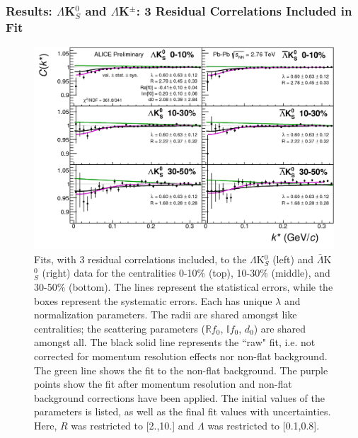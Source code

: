 \documentclass[../AnalysisNoteJBuxton.tex]{subfiles}
\begin{document}
\subsubsection{Results: \texorpdfstring{$\Lambda$K$^{0}_{S}$ and $\Lambda$K$^{\pm}$: 3 Residual Correlations Included in Fit}{TEXT}}
\label{ResultsLamK_3Res}


\begin{figure}[h]
  \centering
  \includegraphics[width=\textwidth]{7_ResultsAndDiscussion/Figures/canKStarCfwFitsLamK0wConj_0010_1030_3050_MomResCrctn_NonFlatBgdCrctn_SingleLamParam_3Res_PrimMaxDecay4fm_UsingXiDataAndCoulombOnly.pdf}
  \caption[$\Lambda$K$^{0}_{S}$($\bar{\Lambda}$K$^{0}_{S}$) Fits with 3 Residuals]{Fits, with 3 residual correlations included, to the $\Lambda$K$^{0}_{S}$ (left) and $\bar{\Lambda}$K$^{0}_{S}$ (right) data for the centralities 0-10\% (top), 10-30\% (middle), and 30-50\% (bottom).
The lines represent the statistical errors, while the boxes represent the systematic errors.
Each has unique $\lambda$ and normalization parameters.
The radii are shared amongst like centralities; the scattering parameters ($\mathbb{R}f_{0}$, $\mathbb{I}f_{0}$, $d_{0}$) are shared amongst all.
The black solid line represents the ``raw" fit, i.e. not corrected for momentum resolution effects nor non-flat background.  
The green line shows the fit to the non-flat background.
The purple points show the fit after momentum resolution and non-flat background corrections have been applied.
The initial values of the parameters is listed, as well as the final fit values with uncertainties.
Here, $R$ was restricted to [2.,10.] and $\Lambda$ was restricted to [0.1,0.8].}
  \label{fig:LamK0wConjFits_3Res}
\end{figure}
\end{document}
